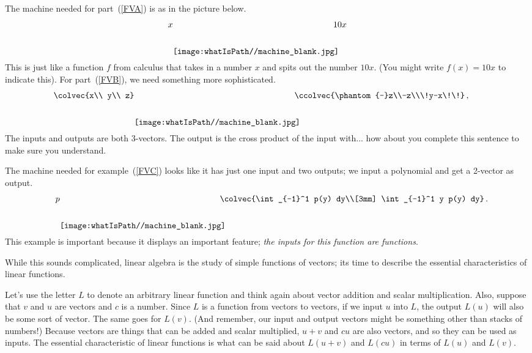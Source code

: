 The machine needed for part~(\ref{FVA}) is as in the picture below. 
$$x \raisebox{-11mm}{\texttt{[image: \\whatIsPath//machine\_blank.jpg]} }\! \! \!\! \! \!10 x\, \hspace{8mm}$$
This is just like a function $f$ from calculus that takes in a number $x$ and spits out the number $10x$. (You might write $f(x)=10x$ to indicate this).
For part~(\ref{FVB}), we need something more sophisticated. 
$$\!\!\!\!\!\!\!\!\!\colvec{x\\ y\\ z} \raisebox{-11mm}{\texttt{[image: \\whatIsPath//machine\_blank.jpg]} }\! \! \!\! \! \!\ccolvec{\phantom{-}z\\-z\\\!y-x\!\!}\, ,$$
The inputs and outputs are both 3-vectors. The output is the cross product of the input with... how about you complete this sentence to make sure you understand.

The machine needed for example~(\ref{FVC}) looks like it has just one input and two outputs; we input a polynomial and get a 2-vector as output.
$$\quad p \raisebox{-11mm}{\texttt{[image: \\whatIsPath//machine\_blank.jpg]} }\! \! \!\! \! \!\colvec{\int_{-1}^1  p(y) dy\\[3mm]
\int_{-1}^1 y p(y) dy}\, .$$
This example is important because it displays an important feature; 
{\it the inputs for this function are functions}.

While this sounds complicated, %
linear algebra is the
study of %
simple %
functions of vectors; its time to describe the essential characteristics of linear functions. 

Let's use the letter $L$ to denote an arbitrary linear function and think again about vector addition and scalar multiplication. 
Also,  suppose that $v$ and $u$ are vectors and $c$ is a number. 
Since $L$ is a function from vectors to vectors, if we input $u$ into $L$, the output $L(u)$ will also be some sort of vector. 
The same goes for 
$L(v)$.
(And remember, our input and output vectors might be something other than stacks of numbers!) 
Because vectors are things that can be added and scalar multiplied, 
$u+v$ and $cu$ are also vectors, and so they can be used as inputs.
The essential characteristic of linear functions is what can be said about 
$L(u+v)$ and $L(cu)$ in terms of 
$L(u)$ and $L(v)$. 

